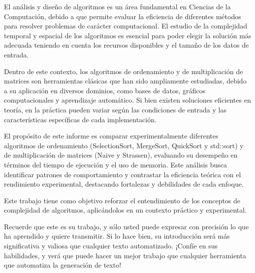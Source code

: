 El análisis y diseño de algoritmos es un área fundamental en Ciencias de la Computación, debido a que permite evaluar la eficiencia de diferentes métodos para resolver problemas de carácter computacional. El estudio de la complejidad temporal y espacial de los algoritmos es esencial para poder  elegir la solución más adecuada teniendo en cuenta los recursos disponibles y el tamaño de los datos de entrada.

Dentro de este contexto, los algoritmos de ordenamiento y de multiplicación de matrices son herramientas clásicas que han sido ampliamente estudiadas, debido a su aplicación en diversos dominios, como bases de datos, gráficos computacionales y aprendizaje automático. Si bien existen soluciones eficientes en teoría, en la práctica pueden variar según las condiciones de entrada y las características específicas de cada implementación.

El propósito de este informe es comparar experimentalmente diferentes algoritmos de ordenamiento (SelectionSort, MergeSort, QuickSort y std::sort) y de multiplicación de matrices (Naive y Strassen), evaluando su desempeño en términos del tiempo de ejecución y el uso de memoria. Este análisis busca identificar patrones de comportamiento y contrastar la eficiencia teórica con el rendimiento experimental, destacando fortalezas y debilidades de cada enfoque.

Este trabajo tiene como objetivo reforzar el entendimiento de los conceptos de complejidad de algoritmos, aplicándolos en un contexto práctico y experimental.



\begin{mdframed}
Recuerde que este es su trabajo, y sólo usted puede expresar con precisión lo que ha aprendido y quiere transmitir. Si lo hace bien, su introducción será más significativa y valiosa que cualquier texto automatizado. ¡Confíe en sus habilidades, y verá que puede hacer un mejor trabajo que cualquier herramienta que automatiza la generación de texto!
\end{mdframed}

